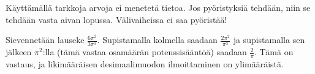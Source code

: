 Käyttämällä tarkkoja arvoja ei menetetä tietoa. Jos pyöristyksiä tehdään, niin se tehdään vasta aivan lopussa. Välivaiheissa ei saa pyöristää!

\begin{esimerkki}
Sievennetään lauseke $\frac{6\pi^2}{3\pi^3}$. Supistamalla kolmella saadaan $\frac{2\pi^2}{\pi^3}$ ja supistamalla sen jälkeen $\pi^2$:lla (tämä vastaa osamäärän potenssisääntöä) saadaan $\frac{2}{\pi}$. Tämä on vastaus, ja likimääräisen desimaalimuodon ilmoittaminen on ylimääräistä.
\end{esimerkki}



